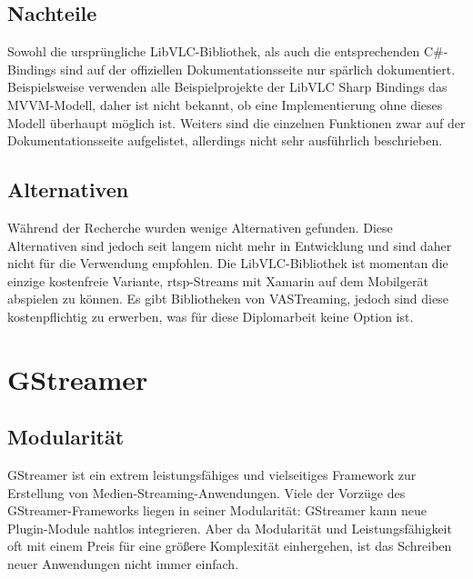 \subsection{Nachteile}
Sowohl die ursprüngliche LibVLC-Bibliothek, als auch die entsprechenden C\#-Bindings sind auf der offiziellen Dokumentationsseite nur spärlich dokumentiert.\cite[vgl.][]{libvlc-sharp-doc}
Beispielsweise verwenden alle Beispielprojekte der LibVLC Sharp Bindings das MVVM-Modell, daher ist nicht bekannt, ob eine Implementierung ohne dieses Modell überhaupt möglich ist.
Weiters sind die einzelnen Funktionen zwar auf der Dokumentationsseite aufgelistet, allerdings nicht sehr ausführlich beschrieben. \cite[vgl.][]{libvlc-sharp-doc}

\subsection{Alternativen}
Während der Recherche wurden wenige Alternativen gefunden. Diese Alternativen sind jedoch seit langem nicht mehr in Entwicklung und sind daher nicht für die Verwendung empfohlen. Die LibVLC-Bibliothek ist momentan die einzige kostenfreie Variante, \acs{rtsp}-Streams mit Xamarin auf dem Mobilgerät abspielen zu können. Es gibt Bibliotheken von VASTreaming, jedoch sind diese kostenpflichtig zu erwerben, was für diese Diplomarbeit keine Option ist. \cite[vgl.][Pricing]{vastreaming}

\section{GStreamer}
\subsection{Modularität}
GStreamer ist ein extrem leistungsfähiges und vielseitiges Framework zur Erstellung von Medien-Streaming-Anwendungen.
Viele der Vorzüge des GStreamer-Frameworks liegen in seiner Modularität:
GStreamer kann neue Plugin-Module nahtlos integrieren.
Aber da Modularität und Leistungsfähigkeit oft mit einem Preis für eine größere Komplexität einhergehen, ist das Schreiben neuer Anwendungen nicht immer einfach.
\cite[aus dem Englischen übersetzt]{gstreamer}\par

